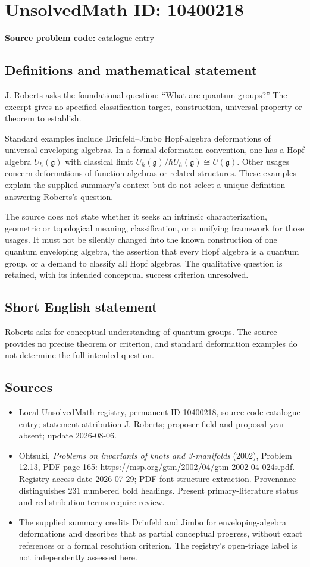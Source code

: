 \documentclass[11pt]{article}
\begin{document}
\section*{UnsolvedMath ID: 10400218}
\textbf{Source problem code:} catalogue entry
\subsection{Definitions and mathematical statement}
J. Roberts asks the foundational question: ``What are quantum groups?'' The excerpt gives no specified classification target, construction, universal property or theorem to establish.

Standard examples include Drinfeld--Jimbo Hopf-algebra deformations of universal enveloping algebras. In a formal deformation convention, one has a Hopf algebra \(U_\hbar(\mathfrak g)\) with classical limit \(U_\hbar(\mathfrak g)/\hbar U_\hbar(\mathfrak g)\cong U(\mathfrak g)\). Other usages concern deformations of function algebras or related structures. These examples explain the supplied summary's context but do not select a unique definition answering Roberts's question.

The source does not state whether it seeks an intrinsic characterization, geometric or topological meaning, classification, or a unifying framework for those usages. It must not be silently changed into the known construction of one quantum enveloping algebra, the assertion that every Hopf algebra is a quantum group, or a demand to classify all Hopf algebras. The qualitative question is retained, with its intended conceptual success criterion unresolved.
\subsection{Short English statement}
Roberts asks for conceptual understanding of quantum groups. The source provides no precise theorem or criterion, and standard deformation examples do not determine the full intended question.
\subsection{Sources}
\begin{itemize}
\item Local UnsolvedMath registry, permanent ID 10400218, source code catalogue entry; statement attribution J. Roberts; proposer field and proposal year absent; update 2026-08-06.
\item Ohtsuki, \emph{Problems on invariants of knots and 3-manifolds} (2002), Problem 12.13, PDF page 165: \url{https://msp.org/gtm/2002/04/gtm-2002-04-024s.pdf}. Registry access date 2026-07-29; PDF font-structure extraction. Provenance distinguishes 231 numbered bold headings. Present primary-literature status and redistribution terms require review.
\item The supplied summary credits Drinfeld and Jimbo for enveloping-algebra deformations and describes that as partial conceptual progress, without exact references or a formal resolution criterion. The registry's open-triage label is not independently assessed here.
\end{itemize}
\end{document}
